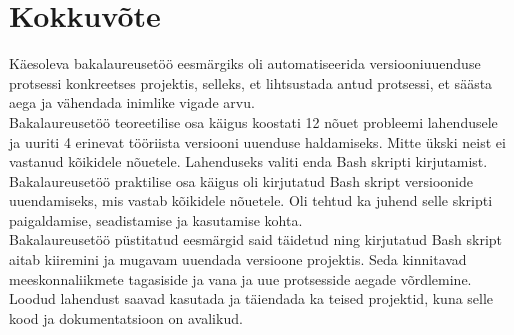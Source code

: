 \documentclass[12pt]{report}
\begin{document}
  \newpage
  
  \section*{Kokkuvõte}
  \label{kokkuvote}
  
  Käesoleva bakalaureusetöö eesmärgiks oli automatiseerida versiooniuuenduse protsessi konkreetses projektis, selleks, et lihtsustada antud protsessi, et säästa aega ja vähendada inimlike vigade arvu.\\
  
  Bakalaureusetöö teoreetilise osa käigus koostati 12 nõuet probleemi lahendusele ja uuriti 4 erinevat tööriista versiooni uuenduse haldamiseks. Mitte ükski neist ei vastanud kõikidele nõuetele. Lahenduseks valiti enda Bash skripti kirjutamist.\\
  
  Bakalaureusetöö praktilise osa käigus oli kirjutatud Bash skript versioonide uuendamiseks, mis vastab kõikidele nõuetele. Oli tehtud ka juhend selle skripti paigaldamise, seadistamise ja kasutamise kohta.\\
  
  Bakalaureusetöö püstitatud eesmärgid said täidetud ning kirjutatud Bash skript aitab kiiremini ja mugavam uuendada versioone projektis. Seda kinnitavad meeskonnaliikmete tagasiside ja vana ja uue protsesside aegade võrdlemine.\\
  
  Loodud lahendust saavad kasutada ja täiendada ka teised projektid, kuna selle kood ja dokumentatsioon on avalikud.

  \newpage
  
\end{document}
